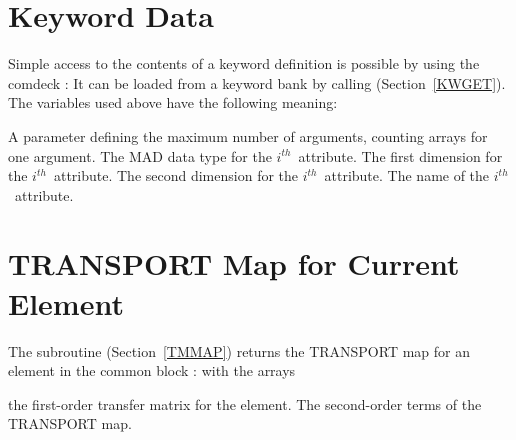 \section{Keyword Data}
\label{Skywd}
Simple access to the contents of a keyword definition is possible
by using the comdeck :
It can be loaded from a keyword bank by calling 
(Section~\ref{KWGET}).
The variables used above have the following meaning:
\begin{mylist}
A parameter defining the maximum number of arguments,
counting arrays for one argument.
The MAD data type for the $i^{th}$~attribute.
The first dimension for the $i^{th}$~attribute.
The second dimension for the $i^{th}$~attribute.
The name of the $i^{th}$~attribute.
\end{mylist}
 
\section{TRANSPORT Map for Current Element}
\label{Smape}
The subroutine  (Section~\ref{TMMAP}) returns the TRANSPORT
map for an element in the common block :
with the arrays
\begin{mylist}
the first-order transfer matrix for the element.
The second-order terms of the TRANSPORT map.
\end{mylist}
 
